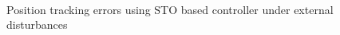 \documentclass[letterpaper%
, twoside%
, 12pt%
,memoire%
, english%
,creativecommons,hyperref%
]{thETS}
\begin{document}
\begin{figure}[H]
	\centering
	 \\ \parbox{0.75\textwidth}{\caption{Position tracking errors using STO based controller under external disturbances\label{Fig:xyzerrSTODist}}}
\end{figure}
\end{document}
